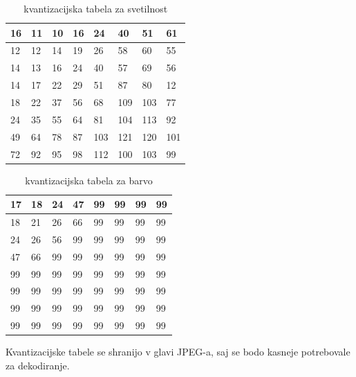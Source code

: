 \documentclass[a4paper,12pt,openright]{book}
\begin{document}
\begin{table}[ht]
\centering
\begin{tabular}{|m{17pt}|m{17pt}|m{17pt}|m{17pt}|m{17pt}|m{17pt}|m{17pt}|m{17pt}|}
\hline
16& 11& 10& 16&  24&  40&  51& 61\\  \hline
12& 12& 14& 19&  26&  58&  60& 55\\  \hline
14& 13& 16& 24&  40&  57&  69& 56\\  \hline
14& 17& 22& 29&  51&  87&  80& 12\\  \hline
18& 22& 37& 56&  68& 109& 103& 77\\  \hline
24& 35& 55& 64&  81& 104& 113& 92\\  \hline
49& 64& 78& 87& 103& 121& 120& 101\\ \hline
72& 92& 95& 98& 112& 100& 103& 99\\  \hline

\end{tabular}
\caption{kvantizacijska tabela za svetilnost}
\label{tab:Kvantizacija_svetilnost}
\end{table}

\begin{table}[ht]
\centering
\begin{tabular}{|m{17pt}|m{17pt}|m{17pt}|m{17pt}|m{17pt}|m{17pt}|m{17pt}|m{17pt}|}
\hline
17& 18& 24& 47& 99& 99& 99& 99 \\ \hline
18& 21& 26& 66& 99& 99& 99& 99 \\ \hline
24& 26& 56& 99& 99& 99& 99& 99 \\ \hline
47& 66& 99& 99& 99& 99& 99& 99 \\ \hline
99& 99& 99& 99& 99& 99& 99& 99 \\ \hline
99& 99& 99& 99& 99& 99& 99& 99 \\ \hline
99& 99& 99& 99& 99& 99& 99& 99 \\ \hline
99& 99& 99& 99& 99& 99& 99& 99 \\ \hline
\end{tabular}
\caption{kvantizacijska tabela za barvo}
\label{tab:Kvantizacija_barva}
\end{table}
Kvantizacijske tabele se shranijo v glavi JPEG-a, saj se bodo kasneje potrebovale za dekodiranje.\par
\end{document}

